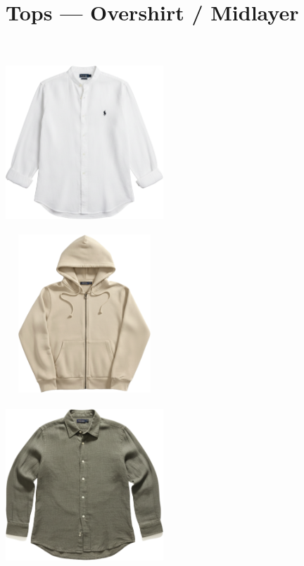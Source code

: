 \documentclass[10pt]{article}
\begin{document}
\section*{Tops — Overshirt / Midlayer}\
\vspace*{2mm}\noindent
\begin{minipage}[c][59.33mm][c]{59.33mm}\centering
\includegraphics[width=59.33mm,height=59.33mm,keepaspectratio]{assets/midlayer/button-up-white.png}\
\end{minipage} \hspace*{6.00mm} \begin{minipage}[c][59.33mm][c]{59.33mm}\centering
\includegraphics[width=59.33mm,height=59.33mm,keepaspectratio]{assets/midlayer/beige-zip-hoodie.png}\
\end{minipage} \hspace*{6.00mm} \begin{minipage}[c][59.33mm][c]{59.33mm}\centering
\includegraphics[width=59.33mm,height=59.33mm,keepaspectratio]{assets/midlayer/green-linen-button-up.png}\
\end{minipage}\
\end{document}
